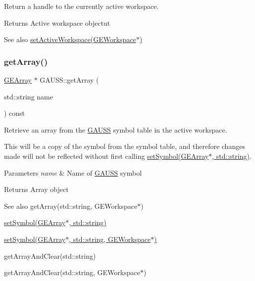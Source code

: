 Return a handle to the currently active workspace. 

\begin{DoxyReturn}{Returns}
Active workspace objectut
\end{DoxyReturn}
\begin{DoxySeeAlso}{See also}
\hyperlink{class_g_a_u_s_s_a6b94adbb7ad799f1e025cd4d7f08f75b}{set\+Active\+Workspace(\+G\+E\+Workspace$\ast$)} 
\end{DoxySeeAlso}
\mbox{\label{class_g_a_u_s_s_ac3ed9591543f48d8b3096a96cfd8d9b9}} 
\subsubsection{\texorpdfstring{get\+Array()}{getArray()}\hspace{0.1cm}{\footnotesize\ttfamily [1/2]}}
{\footnotesize\ttfamily \hyperlink{class_g_e_array}{G\+E\+Array} $\ast$ G\+A\+U\+S\+S\+::get\+Array (\begin{DoxyParamCaption}\item[{std\+::string}]{name }\end{DoxyParamCaption}) const}



Retrieve an array from the \hyperlink{class_g_a_u_s_s}{G\+A\+U\+SS} symbol table in the active workspace. 

This will be a copy of the symbol from the symbol table, and therefore changes made will not be reflected without first calling \hyperlink{class_g_a_u_s_s_a328c6fadd097c46b0651d1985c12759d}{set\+Symbol(\+G\+E\+Array$\ast$, std\+::string)}.


\begin{DoxyParams}{Parameters}
{\em name} & Name of \hyperlink{class_g_a_u_s_s}{G\+A\+U\+SS} symbol \\
\hline
\end{DoxyParams}
\begin{DoxyReturn}{Returns}
Array object
\end{DoxyReturn}
\begin{DoxySeeAlso}{See also}
get\+Array(std\+::string, G\+E\+Workspace$\ast$) 

\hyperlink{class_g_a_u_s_s_a328c6fadd097c46b0651d1985c12759d}{set\+Symbol(\+G\+E\+Array$\ast$, std\+::string)} 

\hyperlink{class_g_a_u_s_s_a0b47905610cb724bd9d6b69ef57ddc60}{set\+Symbol(\+G\+E\+Array$\ast$, std\+::string, G\+E\+Workspace$\ast$)} 

get\+Array\+And\+Clear(std\+::string) 

get\+Array\+And\+Clear(std\+::string, G\+E\+Workspace$\ast$) 
\end{DoxySeeAlso}
\mbox{\label{class_g_a_u_s_s_a78f51d30372b96121792390d37ecbaab}} 
